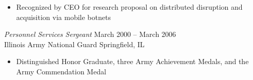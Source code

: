\documentclass[margin,line]{resume}
\begin{document}
\begin{resume}
\begin{itemize}
\small\item Recognized by CEO for research proposal on distributed disruption and acquisition via mobile botnets
\end{itemize}



{\sl Personnel Services Sergeant}  \hfill   March 2000 -- March 2006\\
Illinois Army National Guard  \hfill   Springfield, IL
\begin{itemize} \itemsep -2pt %
\small\item Distinguished Honor Graduate, three Army Achievement Medals, and the Army Commendation Medal
\end{itemize}


\end{resume}
\end{document}
